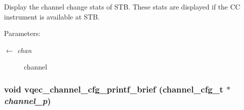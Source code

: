 Display the channel change stats of STB. These stats are displayed if the CC instrument is available at STB.

\begin{Desc}
\item[Parameters:]
\begin{description}
\item[\mbox{$\leftarrow$} {\em chan}]channel \end{description}
\end{Desc}
\subsubsection{\setlength{\rightskip}{0pt plus 5cm}void vqec\_\-channel\_\-cfg\_\-printf\_\-brief (channel\_\-cfg\_\-t $\ast$ {\em channel\_\-p})}\label{vqec__channel__cli_8c_67f58645c4c9bb4c1a6d1d3a13caedd3}


